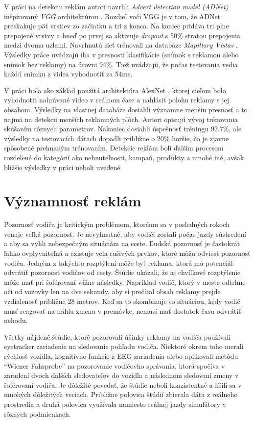 V práci \cite{Hossari} na detekciu reklám autori navrhli \textit{Advert detection model (ADNet)} inšpirovaný \textit{VGG} architektúrou \cite{simonyan2015deep}. Rozdiel voči VGG je v tom, že ADNet preskakuje päť vrstiev zo začiatku a tri z konca. Na koniec pridáva tri plne prepojené vrstvy a hneď po prvej sa aktivuje \textit{dropout} s 50\% stratou prepojenia medzi dvoma uzlami. Navrhnutú sieť trénovali na databáze \textit{Mapillary Vistas} \cite{Mapillary}. Výsledky práce uvádzajú iba v presnosti klasifikácie (snímok s reklamou alebo snímok bez reklamy) na úrovni 94\%. Tiež uvádzajú, že počas testovania vedia každú snímku z videa vyhodnotiť za 54ms.

V práci \cite{GeoTag} bola ako základ použitá architektúra AlexNet \cite{AlexNet}, ktorej cieľom bolo vyhodnotiť nahrávané video v reálnom čase a nahlásiť polohu reklamy s jej obsahom. Výsledky na vlastnej databáze dosiahli významne menšiu presnosť a to najmä na detekcii menších reklamných plôch. Autori opisujú vývoj trénovania skúšaním rôznych parametrov. Nakoniec dosiahli úspešnosť tréningu 92.7\%, ale výsledky na testovacích dátach dopadli približne o 20\% horšie, čo je zjavne spôsobené prehnaným trénovaním. Detekcie reklám boli ďalším procesom rozdelené do kategórií ako nehnuteľnosti, kampaň, produkty a mnohé iné, avšak bližšie výsledky v práci neboli uvedené.

\section{Významnosť reklám}

Pozornosť vodiča je kritickým problémom, ktorému sa v posledných rokoch venuje veľká pozornosť. Je nevyhnutné, aby vodiči zostali počas jazdy sústredení  a aby sa vyhli nebezpečným situáciám na ceste. Ľudská pozornosť je častokrát ľahko ovplyvniteľná a existuje veľa rušivých prvkov, ktoré môžu odviesť pozornosť vodiča. Jedným z takýchto rozptýlení môže byť reklama, ktorá má potenciál odvrátiť pozornosť vodičov od cesty. Štúdie ukázali, že aj chvíľkové rozptýlenie môže mať pri šoférovaní vážne následky. Napríklad vodič, ktorý v meste odtrhne oči od vozovky len na dve sekundy, aby si prečítal obsah reklamy prejde vzdialenosť približne 28 metrov. Keď sa to skombinuje so situáciou, kedy vodič musí reagovať na náhlu zmenu v premávke, nemusí mať dostatok času odvrátiť nehodu.

Všetky nájdené štúdie, ktoré pozorovali účinky reklamy na vodiča používali eyetracker zariadenie na sledovanie pohľadu vodiča. Niektoré okrem toho merali rýchlosť vozidla, kognitívne funkcie z EEG zariadenia alebo aplikovali metódu “Wiener Fahrprobe” \cite{WF} na pozorovanie vodičovho správania, ktorá spočíva v zaradení dvoch ďalších sledovateľov do vozidla a následnom sledovaní zmeny v šoférovaní vodiča.  Je dôležité povedať, že štúdie neboli konzistentné a líšili sa v mnohých dôležitých veciach. Približne polovica štúdií zbierala dáta z reálneho prostredia a druhá polovica využívala namiesto reálnej jazdy simulátory v rôznych podmienkach.

